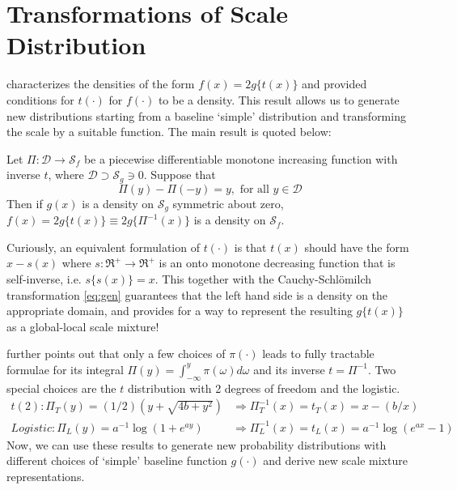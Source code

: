 \documentclass[lineno]{biometrika}
\def\CS{Cauchy-Schl\"omilch }
\begin{document}

\section{Transformations of Scale Distribution} 

\cite{jones2014generating} characterizes the densities of the form $f(x) = 2g\{ t(x) \}$ and provided conditions for $t(\cdot)$ for $f(\cdot)$ to be a density. This result allows us to generate new distributions starting from a baseline `simple' distribution and transforming the scale by a suitable function. The main result is quoted below: 
\begin{proposition}\label{prop:jones}
Let $\Pi: \mathcal{D} \to \mathcal{S}_{f}$ be a piecewise differentiable monotone increasing function with inverse $t$, where $\mathcal{D} \supset \mathcal{S}_{g} \ni 0$. Suppose that 
$$
\Pi(y) - \Pi(-y) = y, \mbox{ for all } y \in \mathcal{D}
$$
Then if $g(x)$ is a density on $\mathcal{S}_{g}$ symmetric about zero, $f(x) = 2g \{ t(x) \} \equiv 2g \{ \Pi^{-1}(x) \}$ is a density on 
$\mathcal{S}_{f}$.
\end{proposition}
Curiously, an equivalent formulation of $t(\cdot)$ is that $t(x)$ should have the form $x-s(x)$ where $s : \Re^+ \to \Re^+$ is an onto monotone decreasing function that is self-inverse, i.e. $s\{ s(x)\} = x$. This together with the \CS transformation \eqref{eq:gen} guarantees that the left hand side is a density on the appropriate domain, and provides for a way to represent the resulting $g\{t(x)\}$ as a global-local scale mixture! 
 
\cite{jones2014generating} further points out that only a few choices of $\pi(\cdot)$ leads to fully tractable formulae for its integral $\Pi(y) = \int_{-\infty}^{y} \pi(\omega) d\omega$ and its inverse $t = \Pi^{-1}$. Two special choices are the $t$ distribution with 2 degrees of freedom and the logistic. 
\begin{align}
t(2): \Pi_{T}(y) = (1/2)(y+\sqrt{4b+y^2}) & \Rightarrow \Pi_T^{-1}(x) = t_T(x) = x - (b/x) \\
Logistic: \Pi_{L}(y) = a^{-1} \log(1+e^{ay}) & \Rightarrow \Pi_L^{-1}(x) = t_L(x) = a^{-1} \log(e^{ax}-1) 
\end{align}
Now, we can use these results to generate new probability distributions with different choices of `simple' baseline function $g(\cdot)$ and derive new scale mixture representations. 
\end{document}
